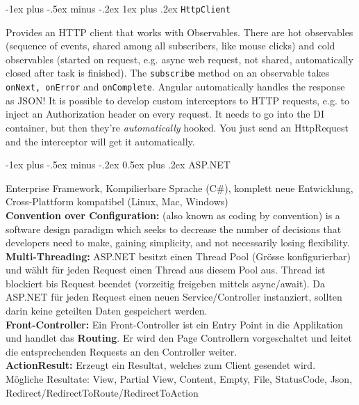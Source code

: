 \documentclass[a4paper, fontsize=6pt]{scrartcl}
\makeatletter
\renewcommand{\section}{\@startsection{section}{1}{0mm}%
    {-1ex plus -.5ex minus -.2ex}%
    {0.5ex plus .2ex}%
    {\normalfont\large\bfseries}}
\renewcommand{\subsubsection}{\@startsection{subsubsection}{3}{0mm}%
    {-1ex plus -.5ex minus -.2ex}%
    {1ex plus .2ex}%
    {\normalfont\small\bfseries}}
\newcommand{\js}[1]{\texttt{#1}}
\makeatother
\begin{document}
\begin{multicols*}{5}
\subsubsection{\js{HttpClient}}

Provides an HTTP client that works with Observables. There are hot observables (sequence of events, shared among all subscribers, like mouse clicks) and cold observables (started on request, e.g. async web request, not shared, automatically closed after task is finished). The \js{subscribe} method on an observable takes \js{onNext, onError} and \js{onComplete}. Angular automatically handles the response as JSON! It is possible to develop custom interceptors to HTTP requests, e.g. to inject an Authorization header on every request. It needs to go into the DI container, but then they're \textit{automatically} hooked. You just send an HttpRequest and the interceptor will get it automatically.


\section{ASP.NET}

Enterprise Framework, Kompilierbare Sprache (C\#), komplett neue Entwicklung, Cross-Plattform kompatibel (Linux, Mac, Windows)\\
\textbf{Convention over Configuration:} (also known as coding by convention) is a software design paradigm which seeks to decrease the number of decisions that developers need to make, gaining simplicity, and not necessarily losing flexibility.\\
\textbf{Multi-Threading:} ASP.NET besitzt einen Thread Pool (Grösse konfigurierbar) und wählt für jeden Request einen Thread aus diesem Pool aus. Thread ist blockiert bis Request beendet (vorzeitig freigeben mittels async/await). Da ASP.NET für jeden Request einen neuen Service/Controller instanziert, sollten darin keine geteilten Daten gespeichert werden.\\
\textbf{Front-Controller:} Ein Front-Controller ist ein Entry Point in die Applikation und handlet das \textbf{Routing}. Er wird den Page Controllern vorgeschaltet und leitet die entsprechenden Requests an den Controller weiter.\\
\textbf{ActionResult:} Erzeugt ein Resultat, welches zum Client gesendet wird. Mögliche Resultate: View, Partial View, Content, Empty, File, StatusCode, Json, Redirect/RedirectToRoute/RedirectToAction \\

\end{multicols*}
\end{document}
